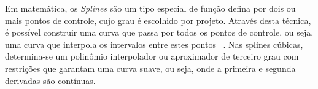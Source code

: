 \documentclass[a4paper,titlepage]{article}
\begin{document}
\begin{center}
  \vspace{1em}
  \vspace{1em}
\end{center}

Em matemática, os \textit{Splines} são um tipo especial de função defina por
dois ou mais pontos de controle, cujo grau é escolhido por projeto. Através
desta técnica, é possível construir uma curva que passa por todos os pontos
de controle, ou seja, uma curva que interpola os intervalos entre estes pontos
~\cite{ruggiero1996calculo}. Nas splines cúbicas, determina-se um
polinômio interpolador ou aproximador de terceiro grau com restrições que
garantam uma curva suave, ou seja, onde a primeira e segunda derivadas são
contínuas.

\begin{center}
  \vspace{1em}
  \vspace{1em}
\end{center}
\end{document}
